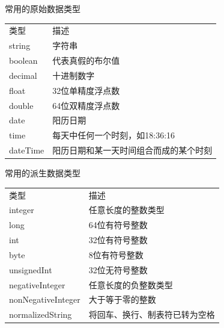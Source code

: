\begin{frame}[fragile]{常用的原始数据类型}
\begin{table}[!hbp] 
\begin{tabular}{|l|l|}
\Xhline{1.3pt}
类型 & 描述 \\ \Xhline{1.3pt}
string & 字符串\\ \hline
boolean & 代表真假的布尔值\\ \hline
decimal & 十进制数字\\ \hline
float & 32位单精度浮点数\\ \hline
double & 64位双精度浮点数\\ \hline
date & 阳历日期\\ \hline
time & 每天中任何一个时刻，如18:36:16\\ \hline
dateTime& 阳历日期和某一天时间组合而成的某个时刻\\ \hline
\end{tabular}
\end{table}
\end{frame}


\begin{frame}[fragile]{常用的派生数据类型}
\begin{table}[!hbp] 
\begin{tabular}{|l|l|}
\Xhline{1.3pt}
类型 & 描述 \\ \Xhline{1.3pt}
integer & 任意长度的整数类型 \\ \hline
long & 64位有符号整数 \\ \hline
int & 32位有符号整数 \\ \hline
byte & 8位有符号整数 \\ \hline
unsignedInt & 32位无符号整数 \\ \hline
negativeInteger & 任意长度的负整数类型 \\ \hline
nonNegativeInteger & 大于等于零的整数 \\ \hline
normalizedString & 将回车、换行、制表符已转为空格 \\ \hline
\end{tabular}
\end{table}
\end{frame}


